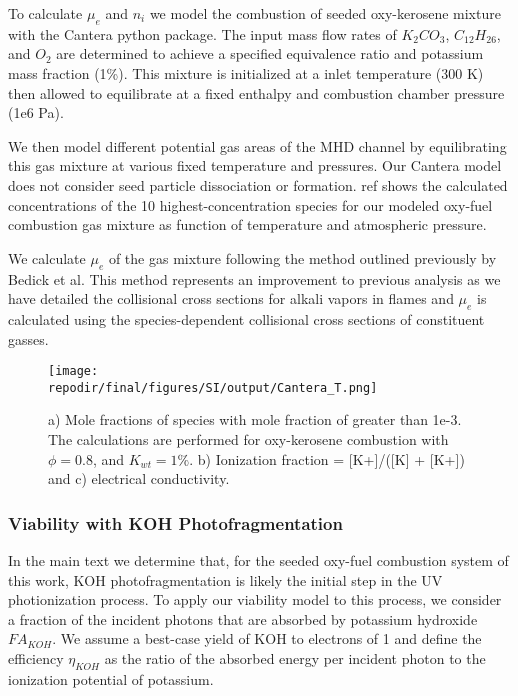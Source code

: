 To calculate $\mu_e$ and $n_i$ we model the combustion of seeded oxy-kerosene mixture with the Cantera python package. The input mass flow rates of $K_2CO_3$, $C_{12}H_{26}$, and $O_2$ are determined to achieve a specified equivalence ratio and potassium mass fraction (1\%). This mixture is initialized at a inlet temperature (300 K) then allowed to equilibrate at a fixed enthalpy and combustion chamber pressure (1e6 Pa).

We then model different potential gas areas of the MHD channel by equilibrating this gas mixture at various fixed temperature and pressures. Our Cantera model does not consider seed particle dissociation or formation. ref shows the calculated concentrations of the 10 highest-concentration species for our modeled oxy-fuel combustion gas mixture as function of temperature and atmospheric pressure.

We calculate $\mu_e$ of the gas mixture following the method outlined previously by Bedick et al.\cite{bedickCombustionPlasmaElectrical2017a} This method represents an improvement to previous analysis as we have detailed the collisional cross sections for alkali vapors in flames and $\mu_e$ is calculated using the species-dependent collisional cross sections of constituent gasses.  


\begin{figure}[ht]
    \centering
    \texttt{[image: \\repodir/final/figures/SI/output/Cantera\_T.png]}
    \caption{a) Mole fractions of species with mole fraction of greater than 1e-3. The calculations are performed for oxy-kerosene combustion with \(\phi = 0.8\), and \(K_{wt} = 1\%\). b) Ionization fraction = {[}K+{]}/({[}K{]} + {[}K+{]}) and c) electrical conductivity.}
    \label{fig:SI_Cantera_T}
\end{figure} 


\hypertarget{photoionization}{%
\subsubsection{Viability with KOH Photofragmentation}\label{photoionization}}

In the main text we determine that, for the seeded oxy-fuel combustion system of this work, KOH photofragmentation is likely the initial step in the UV photionization process. To apply our viability model to this process, we consider a fraction of the incident photons that are absorbed by potassium hydroxide \(FA_{KOH}\). We assume a best-case yield of KOH to electrons of 1 and define the efficiency $\eta_{KOH}$ as the ratio of the absorbed energy per incident photon to the ionization potential of potassium.


